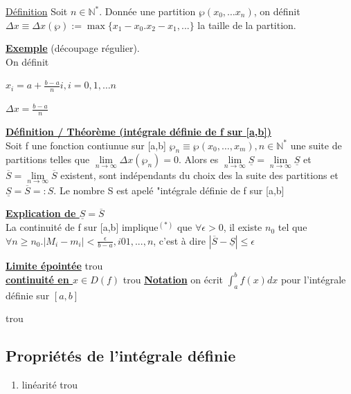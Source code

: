 \documentclass[12pt,a4paper]{article}
\newcommand{\limite}{\lim\limits_}
\newcommand{\evid}[1]{\textbf{\underline{#1}}}
\newcommand{\ninf}{\ensuremath{n \to \infty}}
\newcommand{\N}{\ensuremath{\mathbb{N}} }
\newcommand{\Definition}{\underline{Définition} }
\begin{document}
{\begin{itemize}
\end{itemize}
\begin{boite}
	\Definition Soit $n \in \N^*$. Donnée une partition $\wp(x_0,\ldots x_n)$, on définit $\Delta x \equiv \Delta x (\wp) := \max\{x_1-x_0. x_2-x_1,...\}$ la taille de la partition.
\end{boite}
\evid{Exemple} (découpage régulier).\\
On définit
\begin{center}$
x_i = a + \frac{b-a}{n}i, i=0,1,\ldots n$
\end{center}
\begin{center}$
	\Delta x = \frac{b-a}{n}
$\end{center}


\begin{boite}
\evid{Définition / Théorème (intégrale définie de f sur [a,b])}\\
	Soit f une fonction contiunue sur [a,b] $\wp_n \equiv \wp (x_0,\ldots,x_m), n\in \N^*$ une suite de partitions telles que $\limite{\ninf}{\Delta x (\wp_n)} = 0$. Alors es $\limite{\ninf}{\underline{S}} = \limite{\ninf}{\underline{S}}$ et $\overline{S} = \limite{\ninf}{\overline{S}}$ existent, sont indépendants du choix des la suite des partitions et $\underline{S} = \overline{S} =: S$. Le nombre S est apelé "intégrale définie de f sur [a,b]
\end{boite}
\evid{Explication de $\underline{S} = \overline{S}$}\\
La continuité de f sur [a,b] implique$^{(*)}$ que $\forall \epsilon > 0$, il existe $n_0$ tel que $\forall n \geq n_0. |M_i -m_i| < \frac{\epsilon}{b-a}, i 0 1,...,n$, c'est à dire $|\overline{S} - \underline{S}| \leq \epsilon$

\evid{Limite épointée} {trou}\\
\evid{continuité en $x \in D(f)$} {trou}
\evid{Notation} on écrit $\int_a^b f(x) dx$ pour l'intégrale définie sur $[a,b]$ 

{trou}

\subsection{Propriétés de l'intégrale définie}

\begin{boite}
	\begin{enumerate}
		\item linéarité
		{trou}
	\end{enumerate}
\end{boite}
}
\end{document}
